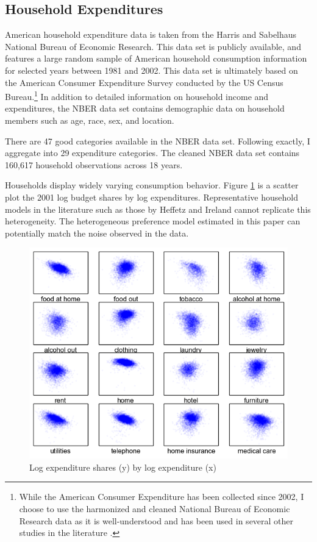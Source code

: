 \documentclass[11pt]{article}
\begin{document}
\begin{CJK}{UTF8}{gbsn}
\subsection{Household Expenditures}
American household expenditure data is taken from the Harris and Sabelhaus National Bureau of Economic Research.\citep{NBERCEX2011}  This data set is publicly available, and features a large random sample of American household consumption information for selected years between 1981 and 2002.  This data set is ultimately based on the American Consumer Expenditure Survey conducted by the US Census Bureau.\footnote{While the American Consumer Expenditure has been collected since 2002, I choose to use the harmonized and cleaned National Bureau of Economic Research data as it is well-understood and has been used in several other studies in the literature \citep{Charlesetal2009,heffetz2011}.} In addition to detailed information on household income and expenditures, the NBER data set contains demographic data on household members such as age, race, sex, and location. 

There are 47 good categories available in the NBER data set.  Following \citet{heffetz2011} exactly,\footnotemark{} I aggregate into 29 expenditure categories.  The cleaned NBER data set contains 160,617 household observations across 18 years.

Households display widely varying consumption behavior.  Figure \ref{fig:exp_shr} is a scatter plot the 2001 log budget shares by log expenditures.  Representative household models in the literature such as those by Heffetz and Ireland cannot replicate this heterogeneity.\footnotemark{} The heterogeneous preference model estimated in this paper can potentially match the noise observed in the data.

\begin{figure}
	\centering
		\includegraphics[scale=1]{pics/shr_plot.png}
	\caption{Log expenditure shares (y) by log expenditure (x)}
	\label{fig:exp_shr}
\end{figure}


\end{CJK}
\end{document}
